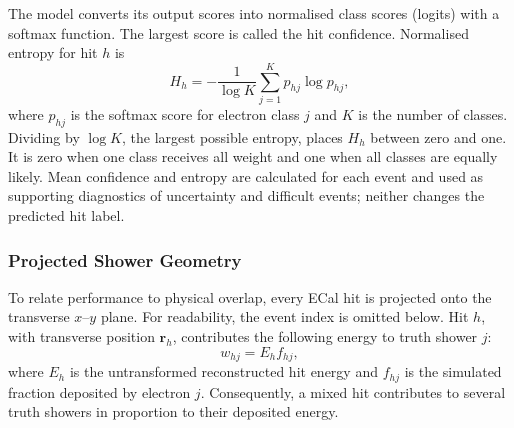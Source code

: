 The model converts its output scores into normalised class scores (logits) with a
softmax function. The largest score is called the hit confidence. Normalised
entropy for hit \(h\) is
\begin{equation}
    H_h
    =
    -\frac{1}{\log K}
    \sum_{j=1}^{K} p_{hj}\log p_{hj},
    \label{eq:normalised_prediction_entropy}
\end{equation}
where \(p_{hj}\) is the softmax score for electron class \(j\) and \(K\) is
the number of classes. Dividing by \(\log K\), the largest possible entropy,
places \(H_h\) between zero and one. It is zero when one class receives all
weight and one when all classes are equally likely. Mean confidence and
entropy are calculated for each event and used as supporting diagnostics of
uncertainty and difficult events; neither changes the predicted hit label.


\subsubsection{Projected Shower Geometry}

To relate performance to physical overlap, every ECal hit is projected onto
the transverse \(x\)--\(y\) plane. For readability, the event index is omitted
below. Hit \(h\), with transverse position \(\boldsymbol r_h\), contributes
the following energy to truth shower \(j\):
\begin{equation}
    w_{hj}=E_h f_{hj},
    \label{eq:shower_geometry_weight}
\end{equation}
where \(E_h\) is the untransformed reconstructed hit energy and \(f_{hj}\) is
the simulated fraction deposited by electron \(j\). Consequently, a mixed hit
contributes to several truth showers in proportion to their deposited energy.

